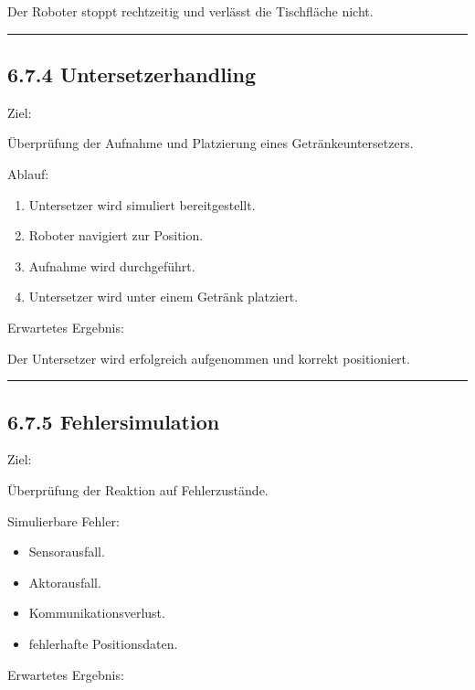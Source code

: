 \documentclass[
]{article}
\providecommand{\tightlist}{%
  \setlength{\itemsep}{0pt}\setlength{\parskip}{0pt}}
\begin{document}
Der Roboter stoppt rechtzeitig und verlässt die Tischfläche nicht.

\begin{center}\rule{0.5\linewidth}{0.5pt}\end{center}

\subsection{6.7.4 Untersetzerhandling}\label{untersetzerhandling-2}

Ziel:

Überprüfung der Aufnahme und Platzierung eines Getränkeuntersetzers.

Ablauf:

\begin{enumerate}
\def\labelenumi{\arabic{enumi}.}
\tightlist
\item
  Untersetzer wird simuliert bereitgestellt.
\item
  Roboter navigiert zur Position.
\item
  Aufnahme wird durchgeführt.
\item
  Untersetzer wird unter einem Getränk platziert.
\end{enumerate}

Erwartetes Ergebnis:

Der Untersetzer wird erfolgreich aufgenommen und korrekt positioniert.

\begin{center}\rule{0.5\linewidth}{0.5pt}\end{center}

\subsection{6.7.5 Fehlersimulation}\label{fehlersimulation}

Ziel:

Überprüfung der Reaktion auf Fehlerzustände.

Simulierbare Fehler:

\begin{itemize}
\tightlist
\item
  Sensorausfall.
\item
  Aktorausfall.
\item
  Kommunikationsverlust.
\item
  fehlerhafte Positionsdaten.
\end{itemize}

Erwartetes Ergebnis:
\end{document}
